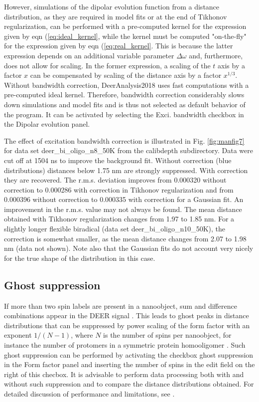 \documentclass{article}
\begin{document}
However, simulations of the dipolar evolution function from a distance distribution, as they are required in model fits or at the end of Tikhonov regularization, can be performed with a pre-computed kernel for the expression given by eqn (\ref{eq:ideal_kernel}, while the kernel must be computed "on-the-fly" for the expression given by eqn (\ref{eq:real_kernel}. This is because the latter expression depends on an additional variable parameter $\Delta \omega$ and, furthermore, does not allow for scaling. In the former expression, a scaling of the $t$ axis by a factor $x$ can be compensated by scaling of the distance axis by a factor $x^{1/3}$. Without bandwidth correction, DeerAnalysis2018 uses fast computations with a pre-computed ideal kernel. Therefore, bandwidth correction considerably slows down simulations and model fits and is thus not selected as default behavior of the program. It can be activated by selecting the {\ttfamily Exci. bandwidth} checkbox in the {\ttfamily Dipolar evolution} panel.

The effect of excitation bandwidth correction is illustrated in Fig. \ref{fig:manfig7} for data set {\ttfamily deer\_bi\_oligo\_n8\_50K} from the {\ttfamily calibdepth} subdirectory. Data were cut off at 1504 ns to improve the background fit. Without correction (blue distributions) distances below 1.75 nm are strongly suppressed. With correction they are recovered. The r.m.s. deviation improves from 0.000320 without correction to 0.000286 with correction in Tikhonov regularization and from 0.000396 without correction to 0.000335 with correction for a Gaussian fit. An improvement in the r.m.s. value may not always be found. The mean distance obtained with Tikhonov regularization changes from 1.97 to 1.85 nm. For a slightly longer flexible biradical (data set {\ttfamily deer\_bi\_oligo\_n10\_50K}), the correction is somewhat smaller, as the mean distance changes from 2.07 to 1.98 nm (data not shown). Note also that the Gaussian fits do not account very nicely for the true shape of the distribution in this case.

\subsection{Ghost suppression}
\label{ghost_suppression}
If more than two spin labels are present in a nanoobject, sum and difference combinations appear in the DEER signal \cite{jeschke2009b}. This leads to ghost peaks in distance distributions that can be suppressed by power scaling of the form factor with an exponent $1/(N-1)$, where $N$ is the number of spins per nanoobject, for instance the number of protomers in a symmetric protein homooligomer \cite{vonHagens2013}. Such ghost suppression can be performed by activating the checkbox {\ttfamily ghost suppression} in the {\ttfamily Form factor} panel and inserting the number of spins in the edit field on the right of this checbox. It is advisable to perform data processing both with and without such suppression and to compare the distance distributions obtained. For detailed discussion of performance and limitations, see \cite{vonHagens2013}.
\end{document}
